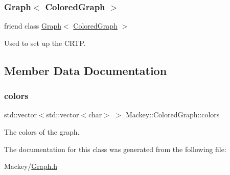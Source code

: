 \subsubsection{\texorpdfstring{Graph$<$ Colored\+Graph $>$}{Graph< ColoredGraph >}}
{\footnotesize\ttfamily friend class \hyperlink{classMackey_1_1Graph}{Graph}$<$ \hyperlink{classMackey_1_1ColoredGraph}{Colored\+Graph} $>$\hspace{0.3cm}{\ttfamily [friend]}}



Used to set up the C\+R\+TP. 



\subsection{Member Data Documentation}
\mbox{\label{classMackey_1_1ColoredGraph_a29fbdcaf9f94f0f5d48e5390ba49b338}} 
\subsubsection{\texorpdfstring{colors}{colors}}
{\footnotesize\ttfamily std\+::vector$<$std\+::vector$<$char$>$ $>$ Mackey\+::\+Colored\+Graph\+::colors}



The colors of the graph. 



The documentation for this class was generated from the following file\+:\begin{DoxyCompactItemize}
\item 
Mackey/\hyperlink{Graph_8h}{Graph.\+h}\end{DoxyCompactItemize}
